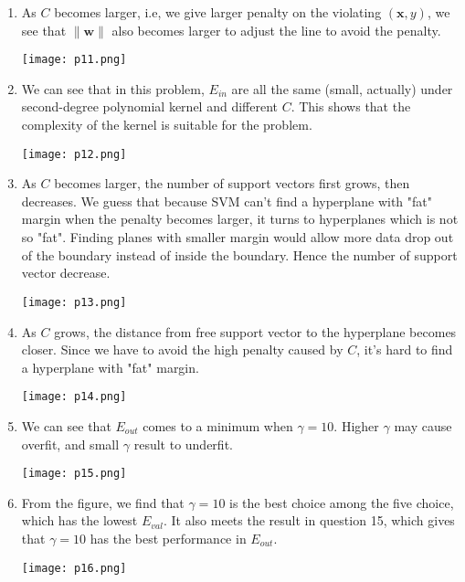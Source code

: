 \documentclass{article}
\begin{document}
\begin{CJK*}{UTF8}{bsmi}
\begin{normalsize}
\begin{enumerate}[label=\textbf{\arabic*}.]
        \item As $C$ becomes larger, i.e, we give larger penalty on the violating $(\mathbf{x}, y)$, we see that $\|\mathbf{w}\|$ also becomes larger to adjust the line to avoid the penalty.
        \begin{center}
            \texttt{[image: p11.png]}
        \end{center}
        
        \newpage
        \item We can see that in this problem, $E_{in}$ are all the same (small, actually) under second-degree polynomial kernel and different $C$. This shows that the complexity of the kernel is suitable for the problem. 
        \begin{center}
            \texttt{[image: p12.png]}
        \end{center}
        
        \item As $C$ becomes larger, the number of support vectors first grows, then decreases. We guess that because SVM can't find a hyperplane with "fat" margin when the penalty becomes larger, it turns to hyperplanes which is not so "fat". Finding planes with smaller margin would allow more data drop out of the boundary instead of inside the boundary. Hence the number of support vector decrease.
        \begin{center}
            \texttt{[image: p13.png]}
        \end{center}
        
        \newpage
        \item As $C$ grows, the distance from free support vector to the hyperplane becomes closer. Since we have to avoid the high penalty caused by $C$, it's hard to find a hyperplane with "fat" margin.
        \begin{center}
            \texttt{[image: p14.png]}
        \end{center}
        
        \item We can see that $E_{out}$ comes to a minimum when $\gamma = 10$. Higher $\gamma$ may cause overfit, and small $\gamma$ result to underfit.
        \begin{center}
            \texttt{[image: p15.png]}
        \end{center}
        
        \newpage
        \item From the figure, we find that  $\gamma = 10$ is the best choice among the five choice, which has the lowest $E_{val}$. It also meets the result in question 15, which gives that $\gamma = 10$ has the best performance in $E_{out}$.
        \begin{center}
            \texttt{[image: p16.png]}
        \end{center}
        

\end{enumerate}
\end{normalsize}
\end{CJK*}
\end{document}

